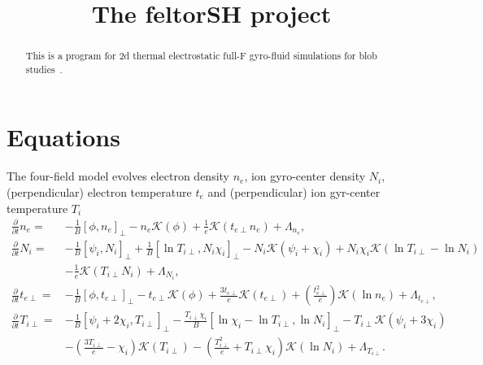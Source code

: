 





\title{The feltorSH project}
\maketitle

\begin{abstract}
    This is a program for 2d thermal electrostatic full-F gyro-fluid simulations for blob studies~\cite{Held2016b}.
\end{abstract}

\section{Equations}
The four-field model evolves electron density 
\(n_e\), ion gyro-center density \(N_i\), (perpendicular) electron temperature \(t_e\) and (perpendicular) ion gyr-center temperature \(T_i\)
\begin{align}
\frac{\partial}{\partial t} n_e =&-
\frac{1}{B} \left[\phi,n_e \right]_{\perp} - n_e \mathcal{K}\left(\phi \right) + \frac{1}{e} \mathcal{K}\left(t_{e\perp} n_e \right) 
+  \Lambda_{n_e},  \\
\frac{\partial}{\partial t} N_i =&
-\frac{1}{B} \left[\psi_i ,N_i \right]_{\perp} 
+\frac{1}{B} \left[\ln T_{i\perp},N_i \chi_i \right]_{\perp}
- N_i \mathcal{K}\left(\psi_i + \chi_i\right) 
+ N_i \chi_i \mathcal{K}\left(\ln T_{i\perp} -  \ln N_i \right) \\ \nonumber
&
- \frac{1}{e} \mathcal{K}\left(T_{i\perp} N_i \right) 
+  \Lambda_{N_i} , \\
   \frac{\partial }{\partial t}  t_{e\perp} =&
   -\frac{1}{B} \left[ \phi , t_{e\perp} \right]_{\perp}  
 -t_{e\perp}   \mathcal{K} (\phi )  
+ \frac{3 t_{e\perp}}{ e }   \mathcal{K} (t_{e\perp})
+  \left(\frac{t_{e\perp}^2}{e}  \right)\mathcal{K} \left(  \ln  n_e  \right) 
 + \Lambda_{t_{e\perp} },  \\
    \frac{\partial }{\partial t}  T_{i\perp} =&
-\frac{1}{B} \left[ \psi_i + 2\chi_i ,T_{i\perp} \right]_{\perp}  
 - \frac{T_{i\perp} \chi_i}{B } \left[\ln  \chi_i - \ln T_{i\perp} , \ln N_i\right]_{\perp}
 -T_{i\perp}  \mathcal{K} (\psi_i + 3\chi_i)  \\ \nonumber
&
- \left(\frac{3 T_{i\perp} }{e}  - \chi_i \right)\mathcal{K} (T_{i\perp} ) 
-  \left(\frac{T_{i\perp} ^2}{e} + T_{i\perp}   \chi_i \right)\mathcal{K} \left(  \ln  N_i  \right) 
 + \Lambda_{T_{i\perp} }.
\end{align}
